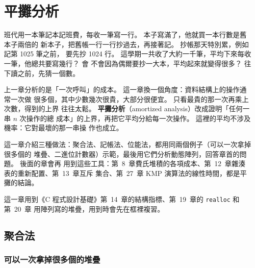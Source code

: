 \chapter{平攤分析}
\label{ch:amortized}

\newcommand{\ctrrow}[4]{%
    \node[anchor=east, font=\small] at (0.3, #1) {#2};
    \foreach \b/\h [count=\k] in {#3} {
        \ifnum\h=1\relax
            \node[flipcell] at (\k*0.85, #1) {\b};
        \else
            \node[ctrcell] at (\k*0.85, #1) {\b};
        \fi
    }
    \node[anchor=west, font=\small] at (3.9, #1) {#4};
}

班代用一本筆記本記班費，每收一筆寫一行。 本子寫滿了，他就買一本行數是舊本子兩倍的
新本子，把舊帳一行一行抄過去，再接著記。 抄帳那天特別累，例如記第 1025 筆之前，
要先抄 1024 行。 這學期一共收了大約一千筆，平均下來每收一筆，他總共要寫幾行？ 會
不會因為偶爾要抄一大本，平均起來就變得很多？ 往下讀之前，先猜一個數。

上一章分析的是「一次呼叫」的成本。 這一章換一個角度：資料結構上的操作通常一次做
很多個，其中少數幾次很貴，大部分很便宜。 只看最貴的那一次再乘上次數，得到的上界
往往太鬆。 \textbf{平攤分析}（amortized analysis）改成證明「任何一串 $n$ 次操作的總
成本」的上界，再把它平均分給每一次操作。 這裡的平均不涉及機率：它對最壞的那一串操
作也成立。

這一章介紹三種做法：聚合法、記帳法、位能法，都用同兩個例子（可以一次拿掉很多個的
堆疊、二進位計數器）示範，最後用它們分析動態陣列，回答章首的問題。 後面的章會再
用到這些工具：第~8~章費氏堆積的各項成本、第~12~章雜湊表的重新配置、第~13~章互斥
集合、第~27~章 KMP 演算法的線性時間，都是平攤的結論。

這一章用到《C 程式設計基礎》第~14~章的結構指標、第~19~章的 \texttt{realloc} 和第~20~章
用陣列寫的堆疊，用到時會先在框裡複習。

\section{聚合法}
\label{sec:amo-aggregate}

\subsection{可以一次拿掉很多個的堆疊}

